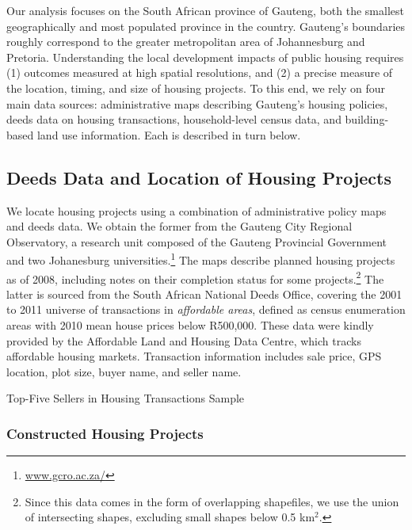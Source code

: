 \documentclass[12pt]{article}
\begin{document}
Our analysis focuses on the South African province of Gauteng, both the smallest geographically and most populated province in the country. Gauteng's boundaries roughly correspond to the greater metropolitan area of Johannesburg and Pretoria. Understanding the local development impacts of public housing requires (1) outcomes measured at high spatial resolutions, and (2) a precise measure of the location, timing, and size of housing projects.  To this end, we rely on four main data sources: administrative maps describing Gauteng's housing policies, deeds data on housing transactions, household-level census data, and building-based land use information. Each is described in turn below.

\subsection{Deeds Data and Location of Housing Projects}

 We locate housing projects using a combination of administrative policy maps and deeds data. We obtain the former from the Gauteng City Regional Observatory, a research unit composed of the Gauteng Provincial Government and two Johanesburg universities.\footnote{\href{url}{www.gcro.ac.za/}} The maps describe planned housing projects as of 2008, including notes on their completion status for some projects.\footnote{Since this data comes in the form of overlapping shapefiles, we use the union of intersecting shapes, excluding small shapes below 0.5 km$^2$.} The latter is sourced from the South African National Deeds Office, covering the 2001 to 2011 universe of transactions in {\it affordable areas}, defined as census enumeration areas with 2010 mean house prices below R500,000. These data were kindly provided by the Affordable Land and Housing Data Centre, which tracks affordable housing markets. Transaction information includes sale price, GPS location, plot size, buyer name, and seller name.

\begin{table}[h!]
\vspace{4mm}
\caption{Top-Five Sellers in Housing Transactions Sample}\label{table:topfivesellers}
\vspace{-2mm}
\centering

\vspace{-4mm}
\end{table}

 \subsubsection*{Constructed Housing Projects}
\end{document}
